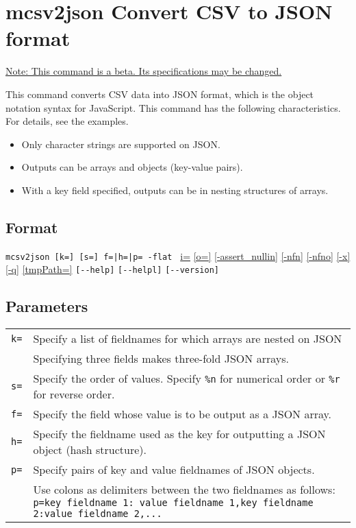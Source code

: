 
%

\section{mcsv2json Convert CSV to JSON format\label{sect:mcsv2json}}
\underline{Note: This command is a beta. Its specifications may be changed.}

This command converts CSV data into JSON format, which is the object notation syntax for JavaScript. 
This command has the following characteristics. 
For details, see the examples.

\begin{itemize}
 \item Only character strings are supported on JSON.
 \item Outputs can be arrays and objects (key-value pairs).
 \item With a key field specified, outputs can be in nesting structures of arrays.
\end{itemize}

\subsection*{Format}
\verb/mcsv2json [k=] [s=] f=|h=|p= -flat /
\hyperref[sect:option_i]{i=}
\hyperref[sect:option_o]{[o=]}
\hyperref[sect:option_assert_nullin]{[-assert\_nullin]}
\hyperref[sect:option_nfn]{[-nfn]}
\hyperref[sect:option_nfno]{[-nfno]}
\hyperref[sect:option_x]{[-x]}
\hyperref[sect:option_q]{[-q]}
\hyperref[sect:option_option_tmppath]{[tmpPath=]}
\verb|[--help]|
\verb|[--helpl]|
\verb|[--version]|\\

\subsection*{Parameters}
\begin{table}[htbp]
{\small
\begin{tabular}{ll}
\verb|k=|    & Specify a list of fieldnames for which arrays are nested on JSON\\
             & Specifying three fields makes three-fold JSON arrays.\\
\verb|s=|    & Specify the order of values. Specify \verb|%n| for numerical order or \verb|%r| for reverse order.\\
\verb|f=|    & Specify the field whose value is to be output as a JSON array.\\
\verb|h=|    & Specify the fieldname used as the key for outputting a JSON object (hash structure).\\
\verb|p=|    & Specify pairs of key and value fieldnames of JSON objects.\\
             & Use colons as delimiters between the two fieldnames as follows: \verb|p=key fieldname 1: value fieldname 1,key fieldname 2:value fieldname 2,...|\\
\end{tabular} 
}
\end{table} 



